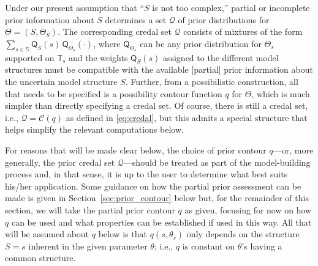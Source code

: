 \documentclass[12pt]{article}
\def\TT{\mathbb{T}}
\def\SS{\mathbb{S}}
\def\prior{\mathsf{Q}}
\def\credal{\mathscr{Q}}
\def\cred{\mathscr{C}}
\begin{document}
Under our present assumption that ``$S$ is not too complex,'' partial or incomplete prior information about $S$ determines a set $\credal$ of prior distributions for $\Theta=(S,\Theta_S)$.  The corresponding credal set $\credal$ consists of mixtures of the form 
$ \sum_{s \in \SS} \prior_S(s) \, \prior_{\Theta_s}(\cdot)$, 
where $\prior_{\Theta_s}$ can be any prior distribution for $\Theta_s$ supported on $\TT_s$ and the weights $\prior_S(s)$ assigned to the different model structures must be compatible with the available [partial] prior information about the uncertain model structure $S$.  Further, from a possibilistic construction, all that needs to be specified is a possibility contour function $q$ for $\Theta$, which is much simpler than directly specifying a credal set.  Of course, there is still a credal set, i.e., $\credal=\cred(q)$ as defined in \eqref{eq:credal}, but this admits a special structure that helps simplify the relevant computations below.  

For reasons that will be made clear below, the choice of prior contour $q$---or, more generally, the prior credal set $\credal$---should be treated as part of the model-building process and, in that sense, it is up to the user to determine what best suits his/her application.  Some guidance on how the partial prior assessment can be made is given in Section~\ref{sec:prior_contour} below but, for the remainder of this section, we will take the partial prior contour $q$ as given, focusing for now on how $q$ can be used and what properties can be established if used in this way.  All that will be assumed about $q$ below is that $q(s,\theta_{s})$ only depends on the structure $S=s$ inherent in the given parameter $\theta$; i.e., $q$ is constant on $\theta$'s having a common structure. 
\end{document}
